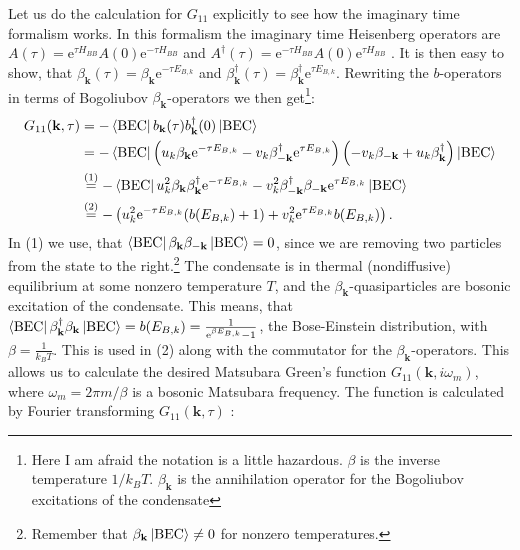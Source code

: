 Let us do the calculation for $G_{11}$ explicitly to see how the imaginary time formalism works. In this formalism the imaginary time Heisenberg operators are $A(\tau) = \text{e}^{\tau H_{BB}}A(0)\text{e}^{-\tau H_{BB}}$ and $A^\dagger(\tau) = \text{e}^{-\tau H_{BB}}A(0)\text{e}^{\tau H_{BB}}$ \cite{BruusFlensberg}. It is then easy to show, that $\beta_\mathbf{k}(\tau) = \beta_\mathbf{k}\text{e}^{-\tau E_{B,k}}$ and $\beta^\dagger_\mathbf{k}(\tau) = \beta^\dagger_\mathbf{k}\text{e}^{\tau E_{B,k}}$. Rewriting the $b$-operators in terms of Bogoliubov $\beta_\mathbf{k}$-operators we then get\footnote{Here I am afraid the notation is a little hazardous. $\beta$ is the inverse temperature $1/k_BT$. $\beta_\mathbf{k}$ is the annihilation operator for the Bogoliubov excitations of the condensate}:
\begin{align}
G_{11}(\mathbf{k},\tau) &= -\bra{\text{BEC}} b_\mathbf{k}(\tau)b_\mathbf{k}^\dagger(0)\ket{\text{BEC}} \nonumber \\
&= -\bra{\text{BEC}} \left(u_k\beta_\mathbf{k}\text{e}^{-\tau E_{B,k}} - v_k \beta^\dagger_{-\mathbf{k}}\text{e}^{\tau E_{B,k}} \right)\left( -v_k\beta_{-\mathbf{k}} + u_k \beta^\dagger_{\mathbf{k}} \right)\ket{\text{BEC}} \nonumber \\
&\overset{(1)}{=} -\bra{\text{BEC}} u_k^2\beta_\mathbf{k}\beta^\dagger_\mathbf{k}\text{e}^{-\tau E_{B,k}} - v_k^2 \beta^\dagger_{-\mathbf{k}}\beta_{-\mathbf{k}}\text{e}^{\tau E_{B,k}} \ket{\text{BEC}} \nonumber \\
&\overset{(2)}{=} -\left(u_k^2 \text{e}^{-\tau E_{B,k}}(b(E_{B,k})+1)+ v_k^2\text{e}^{\tau E_{B,k}}b(E_{B,k})\right). \nonumber
\end{align}
In (1) we use, that $\bra{\text{BEC}}\beta_\mathbf{k}\beta_{-\mathbf{k}}\ket{\text{BEC}} = 0$, since we are removing two particles from the state to the right.\footnote{Remember that $\beta_\mathbf{k}\ket{\text{BEC}} \neq 0$ for nonzero temperatures.} The condensate is in thermal (nondiffusive) equilibrium at some nonzero temperature $T$, and the $\beta_\mathbf{k}$-quasiparticles are bosonic excitation of the condensate. This means, that $\bra{\text{BEC}}\beta_\mathbf{k}^\dagger\beta_{\mathbf{k}}\ket{\text{BEC}} = b(E_{B,k}) = \frac{1}{\text{e}^{\beta E_{B,k}}-1}$, the Bose-Einstein distribution, with $\beta = \frac{1}{k_BT}$. This is used in (2) along with the commutator for the $\beta_\mathbf{k}$-operators. This allows us to calculate the desired Matsubara Green's function $G_{11}(\mathbf{k},i\omega_m)$, where $\omega_m = 2\pi m/\beta$ is a bosonic Matsubara frequency. The function is calculated by Fourier transforming $G_{11}(\mathbf{k},\tau)$ \cite{BruusFlensberg}: 
